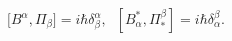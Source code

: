 \begin{equation}
\lbrack B^{\alpha},\Pi_{\beta}]=i\hbar\delta_{\beta}^{\alpha},\;\;[B_{\alpha
}^{\ast},\Pi_{\ast}^{\beta}]=i\hbar\delta_{\alpha}^{\beta}.\label{3.11}%
\end{equation}


